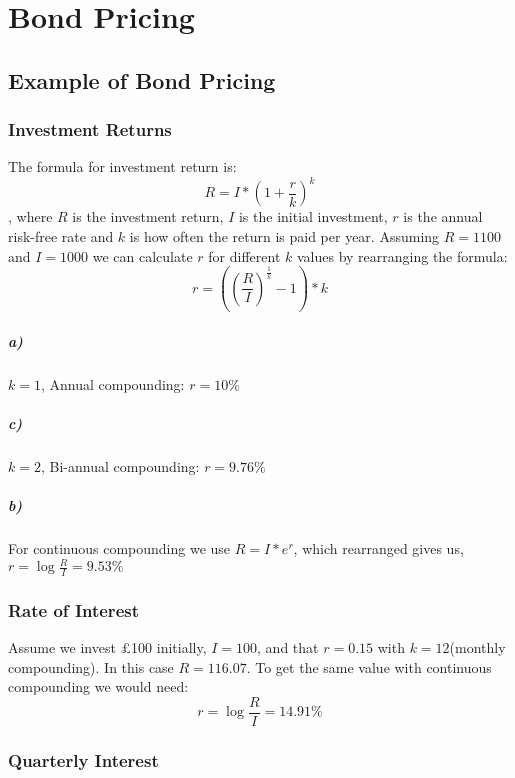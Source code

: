 \chapter{Bond Pricing}

\section{Example of Bond Pricing}

\subsection{Investment Returns}

The formula for investment return is: \[ R = I * (1 + \frac{r}{k})^k \], where $R$ is the investment return, $I$ is the initial investment, $r$ is the annual risk-free rate and $k$ is how often the return is paid per year. Assuming $R = 1100$ and $I = 1000$ we can calculate $r$ for different $k$ values by rearranging the formula: \[ r = ((\frac{R}{I})^{\frac{1}{k}} - 1) * k \]  
  
\paragraph{a)} $k = 1$, Annual compounding: $ r = 10\%$  
\paragraph{c)} $k = 2$, Bi-annual compounding: $ r = 9.76\%$
\paragraph{b)} For continuous compounding we use $ R = I * e^r$, which rearranged gives us, $r = \log \frac{R}{I} = 9.53\% $


\subsection{Rate of Interest}

Assume we invest £100 initially, $I = 100$, and that $r = 0.15$ with $k = 12$(monthly compounding). In this case $R = 116.07$. To get the same value with continuous compounding we would need:
\[r = \log \frac{R}{I} = 14.91\% \]

\subsection{Quarterly Interest}

